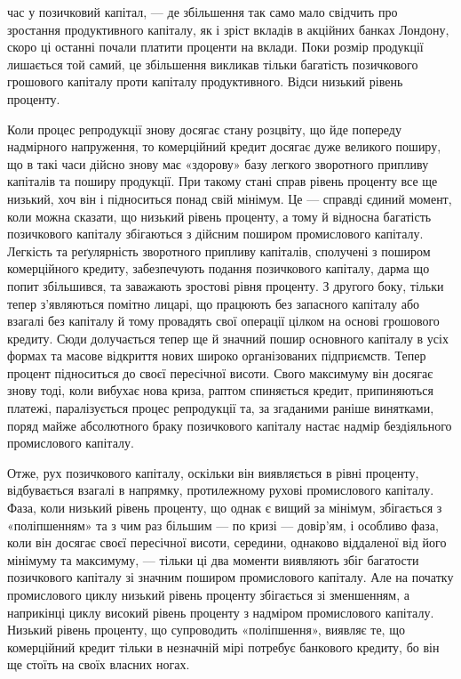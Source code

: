 час у позичковий капітал, — де збільшення так само мало свідчить про зростання
продуктивного капіталу, як і зріст вкладів в акційних банках Лондону, скоро
ці останні почали платити проценти на вклади. Поки розмір продукції лишається
той самий, це збільшення викликав тільки багатість позичкового грошового
капіталу проти капіталу продуктивного. Відси низький рівень проценту.

Коли процес репродукції знову досягає стану розцвіту, що йде попереду надмірного
напруження, то комерційний кредит досягає дуже великого поширу, що в такі
часи дійсно знову має «здорову» базу легкого зворотного припливу капіталів та поширу
продукції. При такому стані справ рівень проценту все ще низький, хоч він і
підноситься понад свій мінімум. Це — справді єдиний момент, коли можна сказати,
що низький рівень проценту, а тому й відносна багатість позичкового капіталу
збігаються з дійсним поширом промислового капіталу. Легкість та реґулярність
зворотного припливу капіталів, сполучені з поширом комерційного кредиту,
забезпечують подання позичкового капіталу, дарма що попит збільшився, та
заважають зростові рівня проценту. З другого боку, тільки тепер з’являються
помітно лицарі, що працюють без запасного капіталу або взагалі без капіталу
й тому провадять свої операції цілком на основі грошового кредиту. Сюди
долучається тепер ще й значний пошир основного капіталу в усіх формах та
масове відкриття нових широко організованих підприємств. Тепер процент підноситься
до своєї пересічної висоти. Свого максимуму він досягає знову тоді, коли вибухає
нова криза, раптом спиняється кредит, припиняються платежі, паралізується
процес репродукції та, за згаданими раніше винятками, поряд майже абсолютного
браку позичкового капіталу настає надмір бездіяльного промислового капіталу.

Отже, рух позичкового капіталу, оскільки він виявляється в рівні проценту,
відбувається взагалі в напрямку, протилежному рухові промислового капіталу.
Фаза, коли низький рівень проценту, що однак є вищий за мінімум, збігається
з «поліпшенням» та з чим раз більшим — по кризі — довір’ям, і особливо фаза,
коли він досягає своєї пересічної висоти, середини, однаково віддаленої від його
мінімуму та максимуму, — тільки ці два моменти виявляють збіг багатости позичкового
капіталу зі значним поширом промислового капіталу. Але на початку
промислового циклу низький рівень проценту збігається зі зменшенням, а наприкінці
циклу високий рівень проценту з надміром промислового капіталу. Низький
рівень проценту, що супроводить «поліпшення», виявляє те, що комерційний
кредит тільки в незначній мірі потребує банкового кредиту, бо він ще стоїть
на своїх власних ногах.

